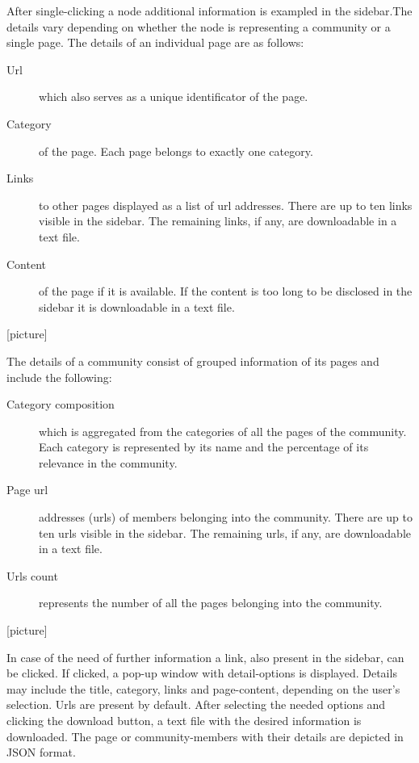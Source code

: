 After single-clicking a node additional information is exampled in the sidebar.The details vary depending on whether the node is representing a community or a single page.  
The details of an individual page are as follows: 
\begin {description}
	\item [Url] which also serves as a unique identificator of the page. 
	\item [Category] of the page. Each page belongs to exactly one category.
	\item[Links] to other pages displayed as a list of url addresses. There are up to ten links visible in the sidebar. The remaining links, if any, are downloadable in a text file. 
	\item[Content] of the page if it is available. If the content is too long to be disclosed in the sidebar it is downloadable in a text file.
\end{description}
[picture]

The details of a community consist of  grouped information of its pages and include the following:
\begin {description}
	\item [Category composition] which is aggregated from the categories of all the pages of the community. Each category is represented by its name and the percentage of its relevance in the community.
	\item [Page url] addresses (urls) of members belonging into the community. There are up to ten urls visible in the sidebar. The remaining urls, if any, are downloadable in a text file. 
	\item[Urls count]represents the number of all the pages belonging into the community. 
\end{description}
[picture]

In case of the need of further information a link, also present in the sidebar, can be clicked. If clicked, a pop-up window with detail-options is displayed. Details may include the title, category, links and page-content, depending on the user's selection. Urls are present by default. After selecting the needed options and clicking the download button, a text file with the desired information is downloaded. The page or community-members with their details are depicted in JSON format.

